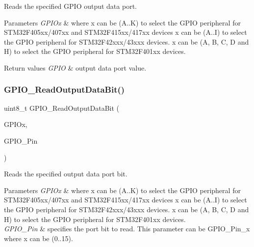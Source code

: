 Reads the specified G\+P\+IO output data port. 


\begin{DoxyParams}{Parameters}
{\em G\+P\+I\+Ox} & where x can be (A..K) to select the G\+P\+IO peripheral for S\+T\+M32\+F405xx/407xx and S\+T\+M32\+F415xx/417xx devices x can be (A..I) to select the G\+P\+IO peripheral for S\+T\+M32\+F42xxx/43xxx devices. x can be (A, B, C, D and H) to select the G\+P\+IO peripheral for S\+T\+M32\+F401xx devices. \\
\hline
\end{DoxyParams}

\begin{DoxyRetVals}{Return values}
{\em G\+P\+IO} & output data port value. \\
\hline
\end{DoxyRetVals}
\mbox{\label{group___g_p_i_o_ga138270f8695b105b7c6ed405792919c1}} 
\subsubsection{\texorpdfstring{G\+P\+I\+O\+\_\+\+Read\+Output\+Data\+Bit()}{GPIO\_ReadOutputDataBit()}}
{\footnotesize\ttfamily uint8\+\_\+t G\+P\+I\+O\+\_\+\+Read\+Output\+Data\+Bit (\begin{DoxyParamCaption}\item[{G\+P\+I\+O\+\_\+\+Type\+Def $\ast$}]{G\+P\+I\+Ox,  }\item[{uint16\+\_\+t}]{G\+P\+I\+O\+\_\+\+Pin }\end{DoxyParamCaption})}



Reads the specified output data port bit. 


\begin{DoxyParams}{Parameters}
{\em G\+P\+I\+Ox} & where x can be (A..K) to select the G\+P\+IO peripheral for S\+T\+M32\+F405xx/407xx and S\+T\+M32\+F415xx/417xx devices x can be (A..I) to select the G\+P\+IO peripheral for S\+T\+M32\+F42xxx/43xxx devices. x can be (A, B, C, D and H) to select the G\+P\+IO peripheral for S\+T\+M32\+F401xx devices. \\
\hline
{\em G\+P\+I\+O\+\_\+\+Pin} & specifies the port bit to read. This parameter can be G\+P\+I\+O\+\_\+\+Pin\+\_\+x where x can be (0..15). \\
\hline
\end{DoxyParams}

